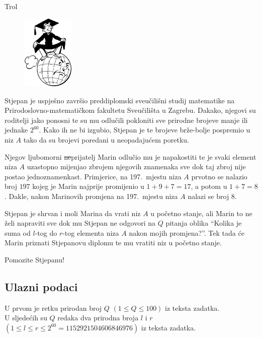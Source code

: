 \begin{statement}[
  problempoints=50,
  timelimit=1 sekunda,
  memorylimit=512 MiB,
]{Trol}

\setlength\intextsep{-0.1cm}
\begin{figure}
\centering
\includegraphics[width=0.22\textwidth]{img/diploma.png}
\end{figure}

Stjepan je uspješno završio preddiplomski sveučilišni studij matematike na
Prirodoslovno-matematičkom fakultetu Sveučilišta u Zagrebu. Dakako, njegovi su
roditelji jako ponosni te su mu odlučili pokloniti sve prirodne brojeve manje
ili jednake $2^{60}$. Kako ih ne bi izgubio, Stjepan je te
brojeve brže-bolje pospremio u niz $A$ tako da su brojevi poredani u
neopadajućem poretku.

Njegov ljubomorni \sout{ne}prijatelj Marin odlučio mu je napakostiti te je svaki
element niza $A$ uzastopno mijenjao zbrojem njegovih znamenaka sve dok taj zbroj
nije postao jednoznamenkast. Primjerice, na 197.\ mjestu niza $A$ prvotno se
nalazio broj $197$ kojeg je Marin najprije promijenio u $1+9+7=17$, a potom u
$1+7=8$. Dakle, nakon Marinovih promjena na 197.\ mjestu niza $A$ nalazi se broj
$8$.

Stjepan je shrvan i moli Marina da vrati niz $A$ u početno stanje, ali Marin to
ne želi napraviti sve dok mu Stjepan ne odgovori na $Q$ pitanja oblika
“Kolika je suma od $l$-tog do $r$-tog elementa niza $A$ nakon mojih promjena?”.
Tek tada će Marin priznati Stjepanovu diplomu te mu vratiti niz u početno
stanje.

Pomozite Stjepanu!

\subsection*{Ulazni podaci}
U prvom je retku prirodan broj $Q$ $(1 \le Q \le 100)$ iz teksta zadatka. \\
U sljedećih su $Q$ redaka dva prirodna broja $l$ i $r$
$(1 \le l \le r \le 2^{60}=1152921504606846976)$ iz teksta zadatka.


\end{statement}
